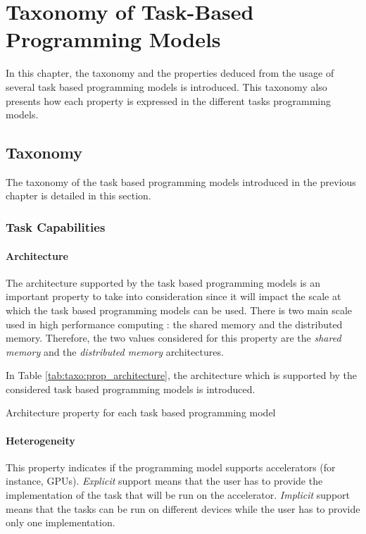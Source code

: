\chapter{Taxonomy of Task-Based Programming Models}
\label{chap:taxonomy}

In this chapter, the taxonomy and the properties deduced from the usage of several task based programming models is introduced.
This taxonomy also presents how each property is expressed in the different tasks programming models.

\section{Taxonomy}
The taxonomy of the task based programming models introduced in the previous chapter is detailed in this section.

\subsection{Task Capabilities}
\subsubsection{Architecture}
The architecture supported by the task based programming models is an important property to take into consideration since it will impact the scale at which the task based programming models can be used.
There is two main scale used in high performance computing : the shared memory and the distributed memory.
Therefore, the two values considered for this property are the \textit{shared memory} and the \textit{distributed memory} architectures.

In Table \ref{tab:taxo:prop_architecture}, the architecture which is supported by the considered task based programming models is introduced.

\begin{table}[H]
	\caption{Architecture property for each task based programming model \label{tab:taxo:prop_architecture}}
	\centering
	\begin{multicols}{2}
		

		
	\end{multicols}
\end{table}

\subsubsection{Heterogeneity}
This property indicates if the programming model supports accelerators (for instance, GPUs).
\textit{Explicit} support means that the user has to provide the implementation of the task that will be run on the accelerator.
\textit{Implicit} support means that the tasks can be run on different devices while the user has to provide only one implementation.

